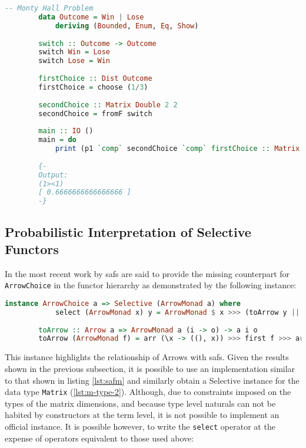 \documentclass[
  oneside,
  11pt, a4paper,
  footinclude=true,
  headinclude=true,
  cleardoublepage=empty
]{scrbook}
\theoremstyle{definition}
\theoremstyle{definition}
\begin{document}
        \begin{lstlisting}[language=Haskell, caption={LAoP Monty Hall Problem},captionpos=b]
        -- Monty Hall Problem
        data Outcome = Win | Lose
            deriving (Bounded, Enum, Eq, Show)
        
        switch :: Outcome -> Outcome
        switch Win = Lose
        switch Lose = Win
        
        firstChoice :: Dist Outcome
        firstChoice = choose (1/3)
        
        secondChoice :: Matrix Double 2 2
        secondChoice = fromF switch 
    
        main :: IO ()
        main = do 
            print (p1 `comp` secondChoice `comp` firstChoice :: Matrix Double 1 1)
            
        {- 
        Output:
        (1><1)
        [ 0.6666666666666666 ]
        -}
        \end{lstlisting}{}
        
        \subsection{Probabilistic Interpretation of Selective Functors}
        
        In the most recent work by \cite{andrey2019selective} \glspl{saf} are said to provide the missing counterpart for \texttt{ArrowChoice} in the functor hierarchy as demonstrated by the following instance:
        
        \begin{lstlisting}[language=Haskell, label={lst:safm}, caption={Selective ArrowMonad instance},captionpos=b]
        instance ArrowChoice a => Selective (ArrowMonad a) where
            select (ArrowMonad x) y = ArrowMonad $ x >>> (toArrow y ||| returnA)
            
        toArrow :: Arrow a => ArrowMonad a (i -> o) -> a i o
        toArrow (ArrowMonad f) = arr (\x -> ((), x)) >>> first f >>> arr (uncurry ($))
        \end{lstlisting}{}
	    
	    This instance highlights the relationship of Arrows with \glspl{saf}. Given the results shown in the previous subsection, it is possible to use an implementation similar to that shown in listing \ref{lst:safm} and similarly obtain a Selective instance for the data type \texttt{Matrix} (\ref{lst:m-type-2}). Although, due to constraints imposed on the types of the matrix dimensions, and because type level naturals can not be habited by constructors at the term level, it is not possible to implement an official instance. It is possible however, to write the \texttt{select} operator at the expense of operators equivalent to those used above:
	    
\end{document}
